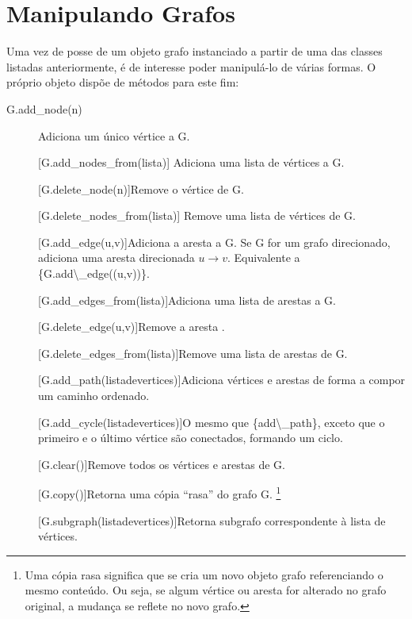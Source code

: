 \documentclass[a4paper,10pt,portuguese]{sphinxmanual}
\begin{document}
\section{Manipulando Grafos}
\label{capgraph:manipulando-grafos}
Uma vez de posse de um objeto grafo instanciado a partir de uma das
classes listadas anteriormente, é de interesse poder manipulá-lo de
várias formas. O próprio objeto dispõe de métodos para este fim:
\begin{description}
\item[{G.add\_node(n)}] \leavevmode
Adiciona um único vértice a G.

{[}G.add\_nodes\_from(lista){]} Adiciona uma lista de vértices a G.

{[}G.delete\_node(n){]}Remove o vértice  de G.

{[}G.delete\_nodes\_from(lista){]} Remove uma lista de vértices de G.

{[}G.add\_edge(u,v){]}Adiciona a aresta  a G. Se G for um
grafo direcionado, adiciona uma aresta direcionada
$u\longrightarrow v$. Equivalente a
\{G.add\textbackslash{}\_edge((u,v))\}.

{[}G.add\_edges\_from(lista){]}Adiciona uma lista de arestas a G.

{[}G.delete\_edge(u,v){]}Remove a aresta .

{[}G.delete\_edges\_from(lista){]}Remove uma lista de arestas de G.

{[}G.add\_path(listadevertices){]}Adiciona vértices e arestas de forma
a compor um caminho ordenado.

{[}G.add\_cycle(listadevertices){]}O mesmo que \{add\textbackslash{}\_path\}, exceto
que o primeiro e o último vértice são conectados, formando um
ciclo.

{[}G.clear(){]}Remove todos os vértices e arestas de G.

{[}G.copy(){]}Retorna uma cópia ``rasa'' do grafo G. \footnote{
Uma cópia rasa significa que se cria um novo objeto grafo
referenciando o mesmo conteúdo. Ou seja, se algum vértice ou aresta
for alterado no grafo original, a mudança se reflete no novo
grafo.
}

{[}G.subgraph(listadevertices){]}Retorna subgrafo correspondente à
lista de vértices.

\end{description}
\end{document}
